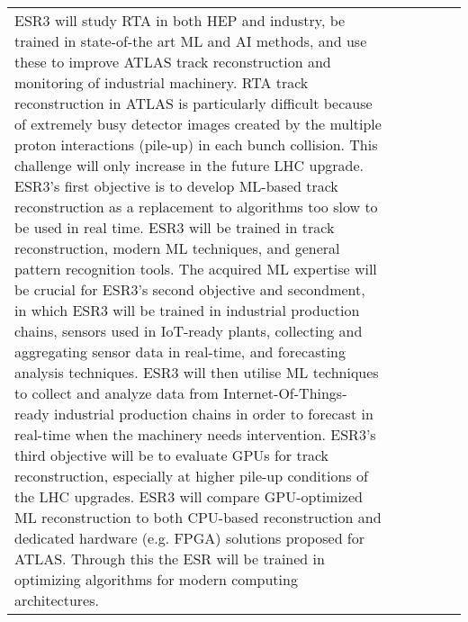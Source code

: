 \begin{center}
{\begin{tabular}{|p{19mm}|p{37mm}|p{16mm}|p{21mm}|p{23mm}|p{64mm}|}
{%
ESR3 will study RTA in both HEP and industry, be trained in state-of-the art ML and AI methods, and use these to improve ATLAS track reconstruction and monitoring of industrial machinery.
RTA track reconstruction in ATLAS is particularly difficult because of extremely busy detector images created by the multiple proton interactions (pile-up) in each bunch collision. This challenge will only increase in the future LHC upgrade.
ESR3's first objective is to develop ML-based track reconstruction as a 
replacement to algorithms too slow to be used in real time. ESR3 will be trained in track reconstruction, modern ML techniques, and general pattern recognition tools. 
The acquired ML expertise will 
be crucial for ESR3's second objective and secondment, in which ESR3 will be trained in industrial production chains, sensors used in IoT-ready plants, collecting and aggregating sensor data in real-time, and forecasting analysis techniques. ESR3 will then utilise ML techniques to collect and analyze 
data from Internet-Of-Things-ready industrial production chains in order to forecast in real-time when the machinery needs intervention.  
ESR3's third 
objective will be to evaluate GPUs for track reconstruction, especially at higher 
pile-up conditions of the LHC upgrades. ESR3 will compare GPU-optimized ML reconstruction to both CPU-based reconstruction and dedicated hardware (e.g. FPGA) solutions proposed for ATLAS. Through this the ESR will be trained in optimizing algorithms for modern computing architectures.
}
\end{tabular}}
\end{center}

